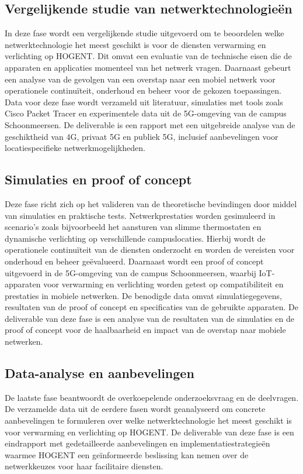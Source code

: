 \subsection{Vergelijkende studie van netwerktechnologieën}
In deze fase wordt een vergelijkende studie uitgevoerd om te beoordelen welke netwerktechnologie het meest geschikt is voor de diensten verwarming en verlichting op HOGENT. Dit omvat een evaluatie van de technische eisen die de apparaten en applicaties momenteel van het netwerk vragen. Daarnaast gebeurt een analyse van de gevolgen van een overstap naar een mobiel netwerk voor operationele continuïteit, onderhoud en beheer voor de gekozen toepassingen. Data voor deze fase wordt verzameld uit literatuur, simulaties met tools zoals Cisco Packet Tracer en experimentele data uit de 5G-omgeving van de campus Schoonmeersen. De deliverable is een rapport met een uitgebreide analyse van de geschiktheid van 4G, privaat 5G en publiek 5G, inclusief aanbevelingen voor locatiespecifieke netwerkmogelijkheden.

\subsection{Simulaties en proof of concept}
Deze fase richt zich op het valideren van de theoretische bevindingen door middel van simulaties en praktische tests. Netwerkprestaties worden gesimuleerd in scenario's zoals bijvoorbeeld het aansturen van slimme thermostaten en dynamische verlichting op verschillende campuslocaties. Hierbij wordt de operationele continuïteit van de diensten onderzocht en worden de vereisten voor onderhoud en beheer geëvalueerd. Daarnaast wordt een proof of concept uitgevoerd in de 5G-omgeving van de campus Schoonmeersen, waarbij IoT-apparaten voor verwarming en verlichting worden getest op compatibiliteit en prestaties in mobiele netwerken. De benodigde data omvat simulatiegegevens, resultaten van de proof of concept en specificaties van de gebruikte apparaten. De deliverable van deze fase is een analyse van de resultaten van de simulaties en de proof of concept voor de haalbaarheid en impact van de overstap naar mobiele netwerken.

\subsection{Data-analyse en aanbevelingen}
De laatste fase beantwoordt de overkoepelende onderzoeksvraag en de deelvragen. De verzamelde data uit de eerdere fasen wordt geanalyseerd om concrete aanbevelingen te formuleren over welke netwerktechnologie het meest geschikt is voor verwarming en verlichting op HOGENT. De deliverable van deze fase is een eindrapport met gedetailleerde aanbevelingen en implementatiestrategieën waarmee HOGENT een geïnformeerde beslissing kan nemen over de netwerkkeuzes voor haar facilitaire diensten.




